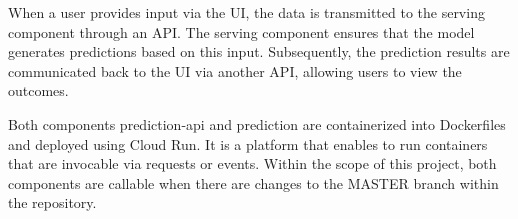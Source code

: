 When a user provides input via the UI, the data is transmitted to the serving component through an API. The serving component ensures that the model generates predictions based on this input. Subsequently, the prediction results are communicated back to the UI via another API, allowing users to view the outcomes.

Both components prediction-api and prediction are containerized into Dockerfiles and deployed using Cloud Run. It is a platform that enables to run containers that are invocable via requests or events. Within the scope of this project, both components are callable when there are changes to the MASTER branch within the repository.








 

